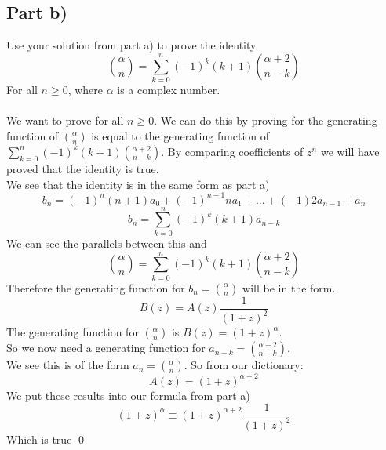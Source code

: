 \documentclass{article}
\begin{document}
\subsection{Part b)}
Use your solution from part a) to prove the identity
\[ \binom{\alpha}{n} = \sum_{k=0}^n (-1)^k (k+1) \binom{\alpha + 2}{n - k} \]
For all $n \geq 0$, where $\alpha$ is a complex number.
\\
\\
We want to prove for all $n \geq 0$.  We can do this by proving for the generating function of $\binom{\alpha}{n}$ is equal to the
generating function of $\sum_{k=0}^n (-1)^k (k+1) \binom{\alpha + 2}{n - k}$.  By comparing coefficients of $z^n$ we will have proved
that the identity is true.
\\
We see that the identity is in the same form as part a)
\[ b_n = (-1)^n (n+1)a_0 + (-1)^{n-1}n a_1 + ... + (-1)2 a_{n-1} + a_n \]
\[ b_n = \sum_{k=0}^n (-1)^k (k+1) a_{n-k} \]
We can see the parallels between this and
\[ \binom{\alpha}{n} = \sum_{k=0}^n (-1)^k (k+1) \binom{\alpha + 2}{n - k} \]
Therefore the generating function for $b_n = \binom{\alpha}{n}$ will be in the form.
\[ B(z) = A(z)\frac{1}{(1+z)^2} \]
The generating function for $\binom{\alpha}{n}$ is $B(z) = (1+z)^\alpha$.
\\
So we now need a generating function for $a_{n-k} = \binom{\alpha + 2}{n - k}$. \\
We see this is of the form $a_n = \binom{\alpha}{n}$.  So from our dictionary:
\[ A(z) = (1+z)^{\alpha+2} \]
We put these results into our formula from part a)
\[ (1+z)^\alpha \equiv (1+z)^{\alpha+2}\frac{1}{(1+z)^2} \]
Which is true \qed
\end{document}
